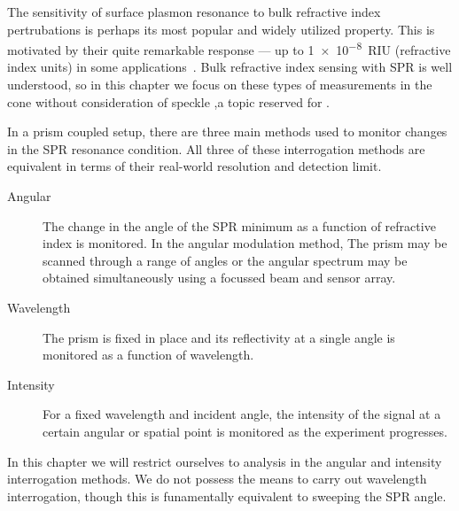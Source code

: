 The sensitivity of surface plasmon resonance to bulk refractive index
pertrubations is perhaps its most popular and widely utilized property.
This is motivated by their quite remarkable response --- up to
\SI{1e-8}{RIU} (refractive index units) in some
applications~\cite{sprreview}.  Bulk refractive index sensing with SPR is
well understood, so in this chapter we focus on these types of measurements
in the cone without consideration of speckle ,a topic reserved for
.  

In a prism coupled setup, there are three main methods used to
monitor changes in the SPR resonance condition.  All three of these
interrogation methods are equivalent in terms of their real-world
resolution and detection limit.~\cite{pines1952collective}
\begin{description}
	\item [{Angular}] The change in the angle of the SPR minimum as a function
					of refractive index is monitored.  In the angular modulation method,
					The prism may be scanned through a range of angles or the angular
					spectrum may be obtained simultaneously using a focussed beam and
					sensor array.
 \item [{Wavelength}] The prism is fixed in place and its reflectivity at
  a single angle is monitored as a function of wavelength.
	\item [{Intensity}] For a fixed wavelength and incident angle, the
		intensity of the signal at a certain angular or spatial point is
		monitored as the experiment progresses.
\end{description}

In this chapter we will restrict ourselves to analysis in the angular and
intensity interrogation methods.  We do not possess the means to carry out
wavelength interrogation, though this is funamentally equivalent to
sweeping the SPR angle. 

